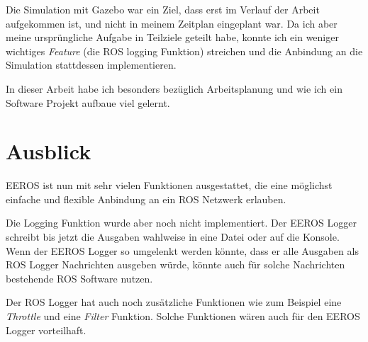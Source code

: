 Die Simulation mit Gazebo war ein Ziel, dass erst im Verlauf der Arbeit aufgekommen ist, und nicht in meinem Zeitplan eingeplant war.
Da ich aber meine ursprüngliche Aufgabe in Teilziele geteilt habe, konnte ich ein weniger wichtiges \textit{Feature} (die ROS logging Funktion) streichen und die Anbindung an die Simulation stattdessen implementieren.

In dieser Arbeit habe ich besonders bezüglich Arbeitsplanung und wie ich ein Software Projekt aufbaue viel gelernt.


\section{Ausblick}
EEROS ist nun mit sehr vielen Funktionen ausgestattet, die eine möglichst einfache und flexible Anbindung an ein ROS Netzwerk erlauben.

Die Logging Funktion wurde aber noch nicht implementiert.
Der EEROS Logger schreibt bis jetzt die Ausgaben wahlweise in eine Datei oder auf die Konsole.
Wenn der EEROS Logger so umgelenkt werden könnte, dass er alle Ausgaben als ROS Logger Nachrichten ausgeben würde, könnte auch für solche Nachrichten bestehende ROS Software nutzen.

Der ROS Logger hat auch noch zusätzliche Funktionen wie zum Beispiel eine \textit{Throttle} und eine \textit{Filter} Funktion.
Solche Funktionen wären auch für den EEROS Logger vorteilhaft.